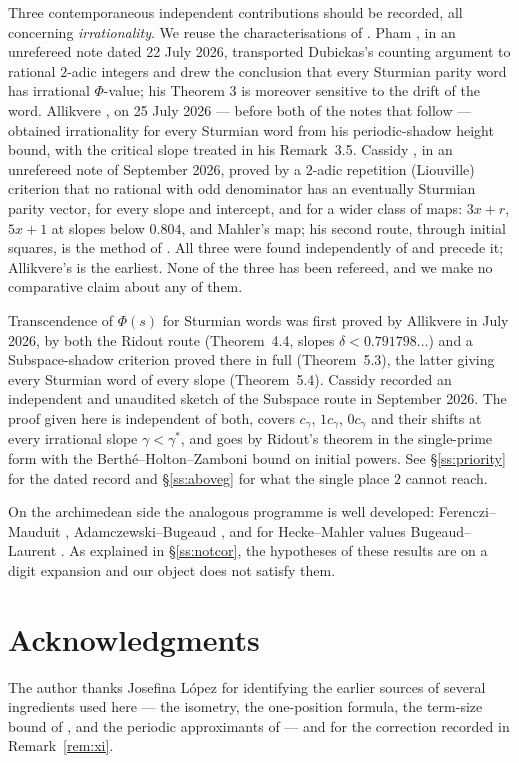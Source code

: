\documentclass[11pt,reqno]{amsart}
\theoremstyle{plain}
\theoremstyle{definition}
\newcommand{\PH}{\Phi}
\newcommand{\gs}{\gamma^{*}}
\begin{document}
Three contemporaneous independent contributions should be recorded, all concerning
\emph{irrationality}. We reuse the characterisations of \cite[\S1]{DJirr}. Pham
\cite[Theorem 3, Corollaries 4--5]{Pham26}, in an unrefereed note dated 22 July 2026, transported
Dubickas's counting argument to rational $2$-adic integers and drew the conclusion that every
Sturmian parity word has irrational $\PH$-value; his Theorem 3 is moreover sensitive to the drift
of the word. Allikvere \cite[Corollary 3.4]{Allikvere26}, on 25 July 2026 --- before both of the
notes that follow --- obtained irrationality for every Sturmian word from his periodic-shadow
height bound, with the critical slope treated in his Remark~3.5. Cassidy
\cite[Theorems R and S]{Cassidy26}, in an unrefereed note of September
2026, proved by a $2$-adic repetition (Liouville) criterion that no rational with odd denominator
has an eventually Sturmian parity vector, for every slope and intercept, and for a wider class of
maps: $3x+r$, $5x+1$ at slopes below $0.804$, and Mahler's map; his second route, through initial
squares, is the method of \cite[\S10]{DJirr}. All three were found independently of \cite{DJirr} and
precede it; Allikvere's is the earliest. None of the three has been refereed, and we make no
comparative claim about any of them.

Transcendence of $\PH(s)$ for Sturmian words was first proved by Allikvere
\cite{Allikvere26} in July 2026, by both the Ridout route (Theorem~4.4, slopes
$\delta<0.791798\ldots$) and a Subspace-shadow criterion proved there in full (Theorem~5.3),
the latter giving every Sturmian word of every slope (Theorem~5.4). Cassidy
\cite[\S4.6]{Cassidy26} recorded an independent and unaudited sketch of the Subspace route in
September 2026. The proof given here is independent of both, covers $c_\gamma$, $1c_\gamma$,
$0c_\gamma$ and their shifts at every irrational slope $\gamma<\gs$, and goes by Ridout's theorem
in the single-prime form \cite[Theorem 1.3]{BK18} with the Berth\'e--Holton--Zamboni bound on
initial powers. See \S\ref{ss:priority} for the dated record and \S\ref{ss:aboveg} for what the
single place $2$ cannot reach.


On the archimedean side the analogous programme is well developed: Ferenczi--Mauduit \cite{FM97},
Adamczewski--Bugeaud \cite{AB07}, and for Hecke--Mahler values Bugeaud--Laurent
\cite{BugeaudLaurent23}. As explained in \S\ref{ss:notcor}, the hypotheses of these results are on a
digit expansion and our object does not satisfy them.

\section*{Acknowledgments}
The author thanks Josefina L\'opez for identifying the earlier sources of several ingredients used
here --- the isometry, the one-position formula, the term-size bound of \cite[Lemma 43]{LS21}, and
the periodic approximants of \cite[Theorem 1]{LS09} --- and for the correction recorded in
Remark~\ref{rem:xi}.
\end{document}
